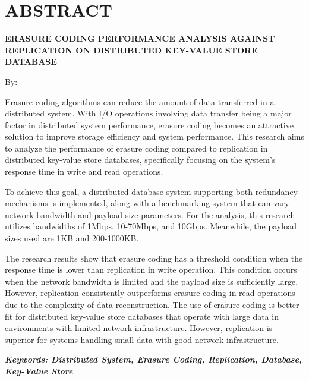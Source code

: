 \clearpage
\chapter*{ABSTRACT}

\begin{center}
	\center
	\begin{singlespace}
		\large\bfseries\MakeUppercase{Erasure Coding Performance Analysis Against Replication on Distributed Key-Value Store Database}

		\normalfont\normalsize
		By:

		\bfseries \theauthor
	\end{singlespace}
\end{center}

\begin{singlespace}
	\small
	Erasure coding algorithms can reduce the amount of data transferred in a distributed system. With I/O operations involving data transfer being a major factor in distributed system performance, erasure coding becomes an attractive solution to improve storage efficiency and system performance. This research aims to analyze the performance of erasure coding compared to replication in distributed key-value store databases, specifically focusing on the system's response time in write and read operations.

	To achieve this goal, a distributed database system supporting both redundancy mechanisms is implemented, along with a benchmarking system that can vary network bandwidth and payload size parameters. For the analysis, this research utilizes bandwidths of 1Mbps, 10-70Mbps, and 10Gbps. Meanwhile, the payload sizes used are 1KB and 200-1000KB.

	The research results show that erasure coding has a threshold condition when the response time is lower than replication in write operation. This condition occurs when the network bandwidth is limited and the payload size is sufficiently large. However, replication consistently outperforms erasure coding in read operations due to the complexity of data reconstruction. The use of erasure coding is better fit for distributed key-value store databases that operate with large data in environments with limited network infrastructure. However, replication is superior for systems handling small data with good network infrastructure.

	\textbf{\textit{Keywords: Distributed System, Erasure Coding, Replication, Database, Key-Value Store }}
\end{singlespace}
\clearpage

\clearpage